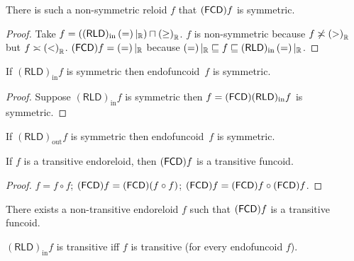 \begin{example}
   There is such a non-symmetric reloid $f$ that $(\mathsf{FCD}) f$ is
   symmetric.
\end{example}

\begin{proof}
Take $f=((\mathsf{RLD})_{\mathrm{in}}\left(\mathord{=}\right)|_{\mathbb{R}})\sqcap \left(\mathord{\geq}\right)_{\mathbb{R}}$.
$f$ is non-symmetric because $f\not\asymp\left(\mathord{>}\right)_{\mathbb{R}}$ but $f\asymp\left(\mathord{<}\right)_{\mathbb{R}}$.
$(\mathsf{FCD}) f=\left(\mathord{=}\right)|_{\mathbb{R}}$ because
$\left(\mathord{=}\right)|_{\mathbb{R}} \sqsubseteq f \sqsubseteq (\mathsf{RLD})_{\mathrm{in}}\left(\mathord{=}\right)|_{\mathbb{R}}$.
\end{proof}

\begin{prop}
  If $(\mathsf{RLD})_{\operatorname{in}} f$ is symmetric then endofuncoid~$f$
  is symmetric.
\end{prop}

\begin{proof}
  Suppose $(\mathsf{RLD})_{\operatorname{in}} f$ is symmetric then $f =
  (\mathsf{FCD}) (\mathsf{RLD})_{\operatorname{in}} f$ is symmetric.
\end{proof}

\begin{conjecture}
  If $(\mathsf{RLD})_{\operatorname{out}} f$ is symmetric then endofuncoid~$f$
  is symmetric.
\end{conjecture}

\begin{prop}
  If $f$ is a transitive endoreloid, then $(\mathsf{FCD}) f$ is a
  transitive funcoid.
\end{prop}

\begin{proof}
  $f = f \circ f$; $(\mathsf{FCD}) f = (\mathsf{FCD}) (f \circ
  f)$; $(\mathsf{FCD}) f = (\mathsf{FCD}) f \circ
  (\mathsf{FCD}) f$.
\end{proof}

\begin{conjecture}
  There exists a non-transitive endoreloid $f$ such that
  $(\mathsf{FCD}) f$ is a transitive funcoid.
\end{conjecture}

\begin{prop}
  $(\mathsf{RLD})_{\operatorname{in}} f$ is transitive iff $f$ is transitive
  (for every endofuncoid $f$).
\end{prop}

